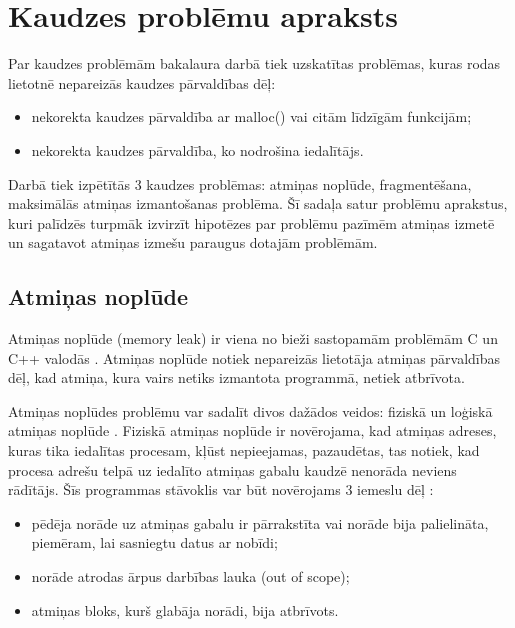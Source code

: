 ﻿%

\section{Kaudzes problēmu apraksts}
 \label{sec:problems}
Par kaudzes problēmām bakalaura darbā tiek uzskatītas problēmas, kuras rodas lietotnē nepareizās kaudzes pārvaldības dēļ: 
\begin{itemize}
\item nekorekta kaudzes pārvaldība ar malloc() vai citām līdzīgām funkcijām;
\item nekorekta kaudzes pārvaldība, ko nodrošina iedalītājs.
\end{itemize}
Darbā tiek izpētītās 3 kaudzes problēmas: atmiņas noplūde, fragmentēšana, maksimālās atmiņas izmantošanas problēma.
Šī sadaļa satur problēmu aprakstus, kuri palīdzēs turpmāk izvirzīt hipotēzes par problēmu pazīmēm atmiņas izmetē un sagatavot atmiņas izmešu paraugus dotajām problēmām.
\subsection{Atmiņas noplūde}

Atmiņas noplūde (memory leak) ir viena no bieži sastopamām problēmām C un C++ valodās \cite{atparv}.
Atmiņas noplūde notiek nepareizās lietotāja atmiņas pārvaldības dēļ, kad atmiņa, kura vairs netiks izmantota programmā, netiek atbrīvota.

Atmiņas noplūdes problēmu var sadalīt divos dažādos veidos: fiziskā un loģiskā atmiņas noplūde \cite{JMMR}.
Fiziskā atmiņas noplūde ir novērojama, kad atmiņas adreses, kuras tika iedalītas procesam,  kļūst nepieejamas, pazaudētas, tas notiek, kad procesa adrešu telpā uz iedalīto atmiņas gabalu kaudzē nenorāda neviens rādītājs.
Šīs programmas stāvoklis var būt novērojams 3 iemeslu dēļ \cite{JMMR}:
\begin{itemize}
\item pēdēja norāde uz atmiņas gabalu ir pārrakstīta vai norāde bija palielināta, piemēram, lai sasniegtu datus ar nobīdi;
\item norāde atrodas ārpus darbības lauka (out of scope);
\item atmiņas bloks, kurš glabāja norādi, bija atbrīvots.
\end{itemize}

